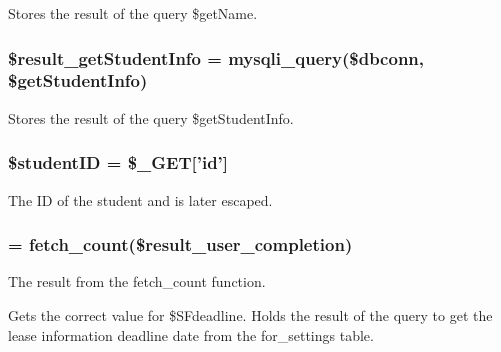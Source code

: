 \-Stores the result of the query \$get\-Name. \hypertarget{displayStudentInfo_8php_ab8bbdcdd0fe4999997ee43345fd69dbe}{
\subsubsection[{\$result\-\_\-get\-Student\-Info}]{\setlength{\rightskip}{0pt plus 5cm}\$result\-\_\-get\-Student\-Info = mysqli\-\_\-query(\$dbconn, \$get\-Student\-Info)}}\label{displayStudentInfo_8php_ab8bbdcdd0fe4999997ee43345fd69dbe}
\-Stores the result of the query \$get\-Student\-Info. \hypertarget{displayStudentInfo_8php_af62eac6f1a6ea66c9f90093940147945}{
\subsubsection[{\$student\-I\-D}]{\setlength{\rightskip}{0pt plus 5cm}\$student\-I\-D = \$\-\_\-\-G\-E\-T\mbox{[}'id'\mbox{]}}}\label{displayStudentInfo_8php_af62eac6f1a6ea66c9f90093940147945}
\-The \-I\-D of the student and is later escaped. \hypertarget{displayStudentInfo_8php_a21986c98f8e5909ee2e102a3ff82fcc1}{
\subsubsection[{while}]{ = {\bf fetch\-\_\-count}(\$result\-\_\-user\-\_\-completion)}}\label{displayStudentInfo_8php_a21986c98f8e5909ee2e102a3ff82fcc1}
\-The result from the fetch\-\_\-count function.

\-Gets the correct value for \$\-S\-Fdeadline. \-Holds the result of the query to get the lease information deadline date from the for\-\_\-settings table. 